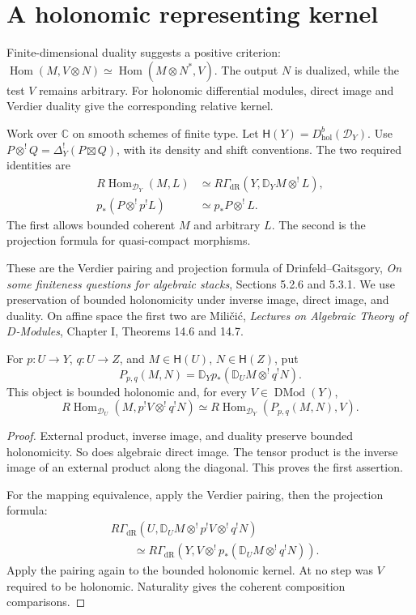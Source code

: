\section{A holonomic representing kernel}
\label{v4-arith:centers:sec:holonomic}

Finite-dimensional duality suggests a positive
criterion:
$\operatorname{Hom}(M,V\otimes N)
\simeq\operatorname{Hom}(M\otimes N^*,V)$.
The output $N$ is dualized, while the
test $V$ remains arbitrary. For holonomic
differential modules, direct image and
Verdier duality give the corresponding
relative kernel.

Work over $\mathbb C$ on smooth schemes
of finite type. Let
$\mathsf H(Y)=D^b_{\mathrm{hol}}(\mathcal D_Y)$.
Use
$P\otimes^!Q=\Delta_Y^!(P\boxtimes Q)$,
with its density and shift conventions.
The two required identities are
\[
\begin{split}
 R\operatorname{Hom}_{\mathcal D_Y}(M,L)
 &\simeq
 R\Gamma_{\mathrm{dR}}(Y,\mathbb D_YM\otimes^!L),\\
 p_*(P\otimes^!p^!L)&\simeq p_*P\otimes^!L.
\end{split}
\]
The first allows bounded coherent $M$
and arbitrary $L$. The second is the
projection formula for quasi-compact
morphisms.

These are the Verdier
pairing and projection formula of
Drinfeld--Gaitsgory,
\emph{On some finiteness questions for
algebraic stacks}, Sections 5.2.6 and
5.3.1. We use preservation of bounded
holonomicity under inverse image,
direct image, and duality. On affine
space the first two are Mili\v{c}i\'c,
\emph{Lectures on Algebraic Theory of
$D$-Modules}, Chapter I, Theorems 14.6
and 14.7.

\begin{lemma}\label{v4-arith:centers:lem:holonomic-kernel}
For $p:U\to Y$, $q:U\to Z$, and
$M\in\mathsf H(U)$, $N\in\mathsf H(Z)$,
put
\[
 P_{p,q}(M,N)
 =\mathbb D_Yp_*
       (\mathbb D_UM\otimes^!q^!N).
\]
This object is bounded holonomic and,
for every $V\in\operatorname{DMod}(Y)$,
\[
 R\operatorname{Hom}_{\mathcal D_U}
       (M,p^!V\otimes^!q^!N)
 \simeq
 R\operatorname{Hom}_{\mathcal D_Y}
       (P_{p,q}(M,N),V).
\]
\end{lemma}

\begin{proof}
External product, inverse image, and
duality preserve bounded holonomicity.
So does algebraic direct image.
The tensor product is the inverse
image of an external product along
the diagonal. This proves the first
assertion.

For the mapping equivalence, apply
the Verdier pairing, then the
projection formula:
\[
\begin{split}
 &R\Gamma_{\mathrm{dR}}
   (U,\mathbb D_UM\otimes^!p^!V\otimes^!q^!N)\\
 &\qquad\simeq
 R\Gamma_{\mathrm{dR}}
   (Y,V\otimes^!p_*(\mathbb D_UM\otimes^!q^!N)).
\end{split}
\]
Apply the pairing again to the bounded
holonomic kernel. At no step was $V$
required to be holonomic. Naturality
gives the coherent composition
comparisons.
\end{proof}

